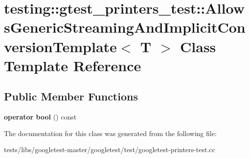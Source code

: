 \hypertarget{classtesting_1_1gtest__printers__test_1_1AllowsGenericStreamingAndImplicitConversionTemplate}{}\section{testing\+:\+:gtest\+\_\+printers\+\_\+test\+:\+:Allows\+Generic\+Streaming\+And\+Implicit\+Conversion\+Template$<$ T $>$ Class Template Reference}
\label{classtesting_1_1gtest__printers__test_1_1AllowsGenericStreamingAndImplicitConversionTemplate}
\subsection*{Public Member Functions}
\begin{DoxyCompactItemize}
\item 
\mbox{\label{classtesting_1_1gtest__printers__test_1_1AllowsGenericStreamingAndImplicitConversionTemplate_af5f8ea44d7d86283b4c004a994ddd7f9}} 
{\bfseries operator bool} () const
\end{DoxyCompactItemize}


The documentation for this class was generated from the following file\+:\begin{DoxyCompactItemize}
\item 
tests/libs/googletest-\/master/googletest/test/googletest-\/printers-\/test.\+cc\end{DoxyCompactItemize}
